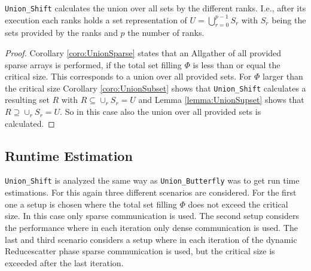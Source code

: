 \begin{theorem}
	\texttt{Union\_Shift} calculates the union over all sets by the different ranks. I.e.,  after its execution each ranks holds a set representation of $U=\bigcup_{r=0}^{p-1} S_r$ with $S_r$ being the sets provided by the ranks and $p$ the number of ranks.
\end{theorem}
\begin{proof}
	Corollary \ref{coro:UnionSparse} states that an Allgather of all provided sparse arrays is performed, if the total set filling $\Phi$ is less than or equal the critical size. This corresponds to a union over all provided sets. For $\Phi$ larger than the critical size Corollary \ref{coro:UnionSubset} shows that \texttt{Union\_Shift} calculates a resulting set $R$ with $R\subseteq \cup_r S_r = U$ and Lemma \ref{lemma:UnionSupset} shows that $R\supseteq \cup_r S_r = U$. So in this case also the union over all provided sets is calculated.
\end{proof}

\subsection{Runtime Estimation}
\texttt{Union\_Shift} is analyzed the same way as \texttt{Union\_Butterfly} was to get run time estimations. For this again three different scenarios are considered. For the first one a setup is chosen where the total set filling $\Phi$ does not exceed the critical size. In this case only sparse communication is used. The second setup considers the performance where in each iteration only dense communication is used. The last and third scenario considers a setup where in each iteration of the dynamic Reducescatter phase sparse communication is used, but the critical size is exceeded after the last iteration.

